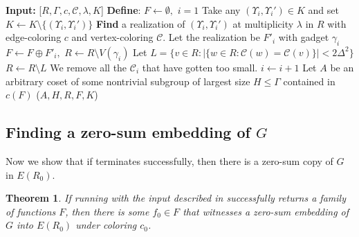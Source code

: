 \documentclass{article}
\newcommand{\cC}{\mathcal{C} }
\newtheorem{theorem}{Theorem}[section]
\theoremstyle{definition}
\begin{document}
\begin{algorithm}[H]\caption{Realization-Finder}\label{Amain}
\begin{algorithmic} 
\State \textbf{Input:} [$R,\Gamma,c,\cC,\lambda, K$]
\State \textbf{Define}: \quad $F\gets \emptyset,$ \quad $i=1$  
\State Take any $(\Upsilon_i,\Upsilon_i')\in K$ and set $K\gets K\setminus\{(\Upsilon_i,\Upsilon_i')\}$
\State\textbf{Find} a realization of
$(\Upsilon_i,\Upsilon_i')$ at multiplicity $\lambda$ in $R$ with edge-coloring $c$ and vertex-coloring $\cC$.
\State Let the realization be $F'_i$ with gadget $\gamma_i$
\State $F \gets F\oplus F'_i,$ \quad $R \gets R \setminus V(\gamma_i)$
\State Let $L=\{v\in R: |\{w\in R: \cC(w)=\cC(v)\}|<2\Delta^2\}$
\State $R \gets R\setminus L$ \Comment We remove all the $\cC_i$ that have gotten too small.
\State $i\gets i+1$
\EndWhile
\State Let $A$ be an arbitrary coset of some nontrivial subgroup of largest size $H\leqslant \Gamma$ contained in $c(F)$
\State \Return ($A,H,R,F,K$)



\end{algorithmic}
\end{algorithm}



\subsection{Finding a zero-sum embedding of $G$}\label{embG}

Now we  show that if  terminates successfully, then there is  a zero-sum copy of $G$ in $E(R_0)$.

\begin{theorem}
    If  running with the input described in  successfully returns a family of functions $F$, then there is some $f_0\in F$ that witnesses a zero-sum embedding of $G$ into $E(R_0)$ under coloring $c_0$. 
\end{theorem}
\end{document}
